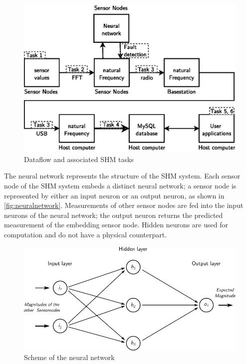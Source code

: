 \documentclass[12pt,a4paper]{scrartcl}
\begin{document}
\begin{figure}[hbtp]
    \centering
    \includegraphics{figures/dataflow_tasks_nn.eps}
    \caption{Dataflow and associated SHM tasks}
    \label{fig:flow}
\end{figure}


The neural network represents the structure of the SHM system.
Each sensor node of the SHM system embeds a distinct neural network; a sensor node is represented by either an input neuron or an output neuron, as shown in \autoref{fig:neuralnetwork}.
Measurements of other sensor nodes are fed into the input neurons of the neural network; the output neuron returns the predicted measurement of the embedding sensor node.
Hidden neurons are used for computation and do not have a physical counterpart.

\begin{figure}[hbtp]
    \centering
    \includegraphics{figures/neuralnetwork.pdf}
    \caption{Scheme of the neural network}
    \label{fig:neuralnetwork}
\end{figure}
\end{document}
